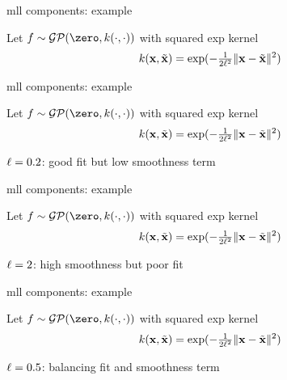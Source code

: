 \documentclass[11pt,compress,t,notes=noshow, xcolor=table]{beamer}
\begin{document}

\begin{framei}[sep=L]{mll components: example}
\item Let $f \sim \mathcal{GP}(\zero, k(\cdot, \cdot))$ with squared exp kernel $$k(\mathbf{x}, \tilde{\mathbf{x}}) = \exp(-\tfrac{1}{2 \ell^2} \| \mathbf{x} - \tilde{\mathbf{x}} \|^2)$$
\vfill
{}
\end{framei}

\begin{framei}[sep=L]{mll components: example}
\item Let $f \sim \mathcal{GP}(\zero, k(\cdot, \cdot))$ with squared exp kernel $$k(\mathbf{x}, \tilde{\mathbf{x}}) = \exp(-\tfrac{1}{2 \ell^2} \| \mathbf{x} - \tilde{\mathbf{x}} \|^2)$$
\item $\ell = 0.2$: good fit but low smoothness term
\vfill
{}
\end{framei}

\begin{framei}[sep=L]{mll components: example}
\item Let $f \sim \mathcal{GP}(\zero, k(\cdot, \cdot))$ with squared exp kernel $$k(\mathbf{x}, \tilde{\mathbf{x}}) = \exp(-\tfrac{1}{2 \ell^2} \| \mathbf{x} - \tilde{\mathbf{x}} \|^2)$$
\item $\ell = 2$: high smoothness but poor fit
\vfill
{}
\end{framei}

\begin{framei}[sep=L]{mll components: example}
\item Let $f \sim \mathcal{GP}(\zero, k(\cdot, \cdot))$ with squared exp kernel $$k(\mathbf{x}, \tilde{\mathbf{x}}) = \exp(-\tfrac{1}{2 \ell^2} \| \mathbf{x} - \tilde{\mathbf{x}} \|^2)$$
\item $\ell = 0.5$: balancing fit and smoothness term
\vfill
{}
\end{framei}

\end{document}
